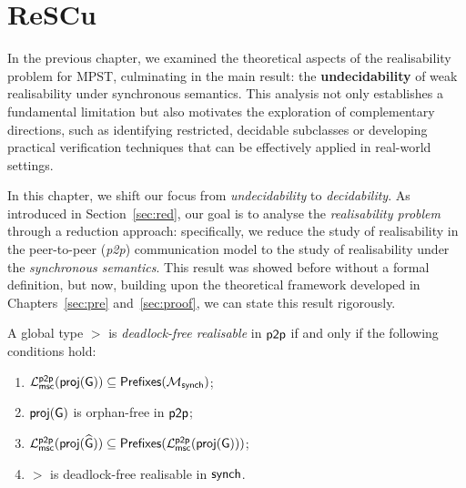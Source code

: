 \chapter{ReSCu}\label{sec:rescu}
In the previous chapter, we examined the theoretical aspects of the
realisability problem for MPST, culminating in the main result: the
\textbf{undecidability} of weak realisability under synchronous
semantics. This analysis not only establishes a fundamental limitation
but also motivates the exploration of complementary directions, such as
identifying restricted, decidable subclasses or developing practical
verification techniques that can be effectively applied in real-world
settings.  

In this chapter, we shift our focus from \emph{undecidability} to \emph{decidability}.
As introduced in Section~\ref{sec:red}, our goal is to analyse the
\emph{realisability problem} through a reduction approach: specifically, 
we reduce the study of realisability in the peer-to-peer (\textit{p2p}) 
communication model to the study of realisability under the 
\emph{synchronous semantics}.
This result was showed before without a formal definition, but now, 
building upon the theoretical framework developed in 
Chapters~\ref{sec:pre} and~\ref{sec:proof}, we can state this 
result rigorously.

\bigskip

\begin{theorem}
    \label{thm:main-theorem-realisability}
    A global type $\gt$ is \emph{deadlock-free realisable} in $\mathsf{p2p}$
    if and only if the following conditions hold:
    \begin{enumerate}
        \item $\mathcal{L}_{\mathsf{msc}}^{\mathsf{p2p}}(\mathsf{proj}(\mathsf{G}))
              \subseteq \mathsf{Prefixes}(\mathcal{M}_{\mathsf{synch}})$;
        \item $\mathsf{proj}(\mathsf{G})$ is orphan-free in $\mathsf{p2p}$;
        \item $\mathcal{L}_{\mathsf{msc}}^{\mathsf{p2p}}(\mathsf{proj}(\widehat{\mathsf{G}}))
              \subseteq \mathsf{Prefixes}(
                  \mathcal{L}_{\mathsf{msc}}^{\mathsf{p2p}}(\mathsf{proj}(\mathsf{G}))
              )$;
        \item $\gt$ is deadlock-free realisable in $\mathsf{synch}$.
    \end{enumerate}
\end{theorem}

\bigskip


